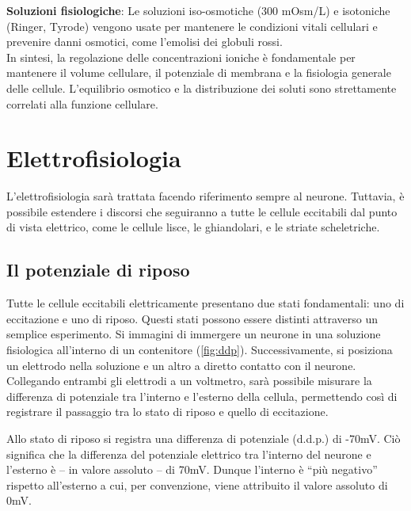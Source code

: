 {    \textbf{Soluzioni fisiologiche}: Le soluzioni iso-osmotiche (300 mOsm/L) e isotoniche (Ringer, Tyrode) vengono usate per mantenere le condizioni vitali cellulari e prevenire danni osmotici, come l'emolisi dei globuli rossi.\\
    
    In sintesi, la regolazione delle concentrazioni ioniche è fondamentale per mantenere il volume cellulare, il potenziale di membrana e la fisiologia generale delle cellule. L'equilibrio osmotico e la distribuzione dei soluti sono strettamente correlati alla funzione cellulare.
}

\chapter{Elettrofisiologia}
L'elettrofisiologia sarà trattata facendo riferimento sempre al neurone. Tuttavia, è possibile estendere i discorsi che seguiranno a tutte le cellule eccitabili dal punto di vista elettrico, come le cellule lisce, le ghiandolari, e le striate scheletriche.

\section{Il potenziale di riposo}
Tutte le cellule eccitabili elettricamente presentano due stati fondamentali: uno di eccitazione e uno di riposo. Questi stati possono essere distinti attraverso un semplice esperimento. Si immagini di immergere un neurone in una soluzione fisiologica all'interno di un contenitore (\autoref{fig:ddp}). Successivamente, si posiziona un elettrodo nella soluzione e un altro a diretto contatto con il neurone. Collegando entrambi gli elettrodi a un voltmetro, sarà possibile misurare la differenza di potenziale tra l'interno e l'esterno della cellula, permettendo così di registrare il passaggio tra lo stato di riposo e quello di eccitazione.


Allo stato di riposo si registra una differenza di potenziale (d.d.p.) di -70mV. Ciò significa che la differenza del potenziale elettrico tra l'interno del neurone e l'esterno è -- in valore assoluto -- di 70mV. Dunque l'interno è ``più negativo'' rispetto all'esterno a cui, per convenzione, viene attribuito il valore assoluto di 0mV.


